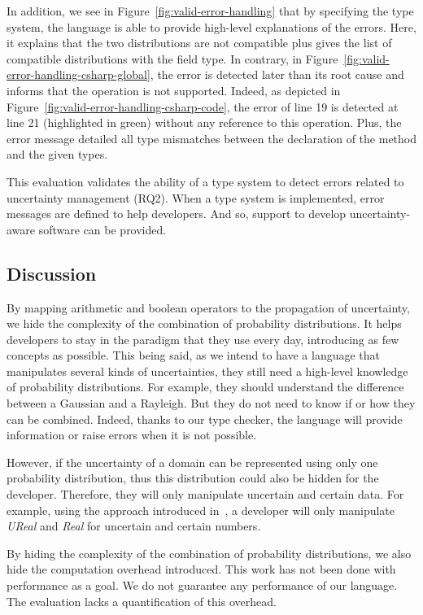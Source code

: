 In addition, we see in Figure~\ref{fig:valid-error-handling} that by specifying the type system, the language is able to provide high-level explanations of the errors.
Here, it explains that the two distributions are not compatible plus gives the list of compatible distributions with the field type.
In contrary, in Figure~\ref{fig:valid-error-handling-csharp-global}, the error is detected later than its root cause and informs that the operation is not supported.
Indeed, as depicted in Figure~\ref{fig:valid-error-handling-csharp-code}, the error of line 19 is detected at line 21 (highlighted in green) without any reference to this operation.
Plus, the error message detailed all type mismatches between the declaration of the method and the given types.

This evaluation validates the ability of a type system to detect errors related to uncertainty management (RQ2).
When a type system is implemented, error messages are defined to help developers.
And so, support to develop uncertainty-aware software can be provided. 

\subsection{Discussion}

By mapping arithmetic and boolean operators to the propagation of uncertainty, we hide the complexity of the combination of probability distributions.
It helps developers to stay in the paradigm that they use every day, introducing as few concepts as possible.
This being said, as we intend to have a language that manipulates several kinds of uncertainties, they still need a high-level knowledge of probability distributions.
For example, they should understand the difference between a Gaussian and a Rayleigh.
But they do not need to know if or how they can be combined.
Indeed, thanks to our type checker, the language will provide information or raise errors when it is not possible.

However, if the uncertainty of a domain can be represented using only one probability distribution, thus this distribution could also be hidden for the developer.
Therefore, they will only manipulate uncertain and certain data.
For example, using the approach introduced in~\cite{DBLP:conf/sle/MayerhoferWV16}, a developer will only manipulate \textit{UReal} and \textit{Real} for uncertain and certain numbers.

By hiding the complexity of the combination of probability distributions, we also hide the computation overhead introduced.
This work has not been done with performance as a goal.
We do not guarantee any performance of our language.
The evaluation lacks a quantification of this overhead.